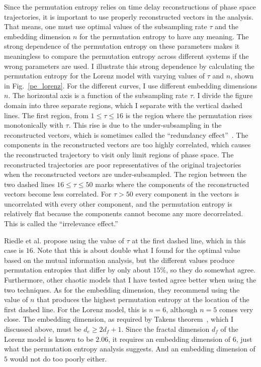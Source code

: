 Since the permutation entropy relies on time delay reconstructions of phase space trajectories, it is important to use properly reconstructed vectors in the analysis. That means, one must use
optimal values of the subsampling rate $\tau$ and the embedding dimension $n$ for the permutation entropy to have any meaning. The strong dependence of the permutation entropy on these
parameters makes it meaningless to compare the permutation entropy across different systems if the wrong parameters are used. 
I illustrate this strong dependence by calculating the permutation entropy for the Lorenz model
with varying values of $\tau$ and $n$, shown in Fig.~\ref{pe_lorenz}. For the different curves, I use different embedding dimensions $n$. The horizontal axis is a function of the subsampling rate
$\tau$. I divide the figure domain into three separate regions, which I separate with the vertical dashed lines. The first region, from $1 \le \tau \le 16$ is the region where the permutation rises
monotonically with $\tau$. This rise is due to the under-subsampling in the reconstructed vectors, which is sometimes called the ``redundancy effect''~\cite{riedle2013}. The components in the
reconstructed vectors are too highly correlated, which causes the reconstructed trajectory to visit only limit regions of phase space. The reconstructed trajectories are poor representatives
of the original trajectories when the reconstructed vectors are under-subsampled. The region between the two dashed lines $16 \le \tau \le 50$ marks where 
the components of the reconstructed vectors become less correlated. 
For $\tau > 50$ every component in the vectors is uncorrelated with every other component, and the permutation entropy is relatively flat because the components cannot become any more decorrelated. 
This is called the ``irrelevance effect.''

Riedle et al. propose using the value of $\tau$ at the first dashed line, which in this case is $16$. Note that this is about double what I found for the optimal value based on the mutual information
analysis, but the different values produce permutation entropies that differ by only about $15\%$, so they do somewhat agree. Furthermore, other chaotic models that I have tested agree better when
using the two techniques.
As for the embedding dimension, they recommend using the value of $n$ that produces the highest permutation entropy at the location of the first dashed line. For the Lorenz model, this is
$n=6$, although $n=5$ comes very close. The embedding dimension, as required by Takens theorem~\cite{takens1981}, which I discussed
above, must be $d_e \ge 2 d_f + 1$. Since the fractal dimension $d_f$ of the Lorenz model is known to be $2.06$, it requires an embedding dimension of $6$, just what the permutation entropy
analysis suggests. And an embedding dimension of $5$ would not do too poorly either.

